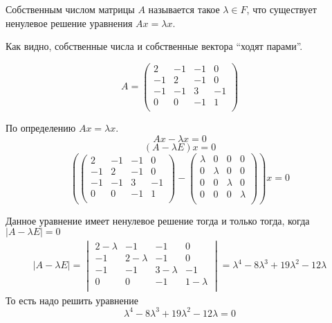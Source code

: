 \begin{definition}
Собственным числом матрицы $A$ называется такое $\lambda \in F$, что существует ненулевое решение уравнения $Ax = \lambda x$.
\end{definition}

Как видно, собственные числа и собственные вектора ``ходят парами''.

\begin{example}

$$
A = \left({
  \begin{array}{rrrrrr}
  2  & -1 & -1 & 0  \\
  -1 & 2  & -1 & 0  \\
  -1 & -1 & 3  & -1 \\
  0  & 0  & -1 & 1  \\
  \end{array}
  }\right)
$$

По определению $Ax = \lambda x$. 
$$Ax - \lambda x = 0$$
$$(A - \lambda E) x = 0$$
$$
(\left({
  \begin{array}{rrrrrr}
  2  & -1 & -1 & 0  \\
  -1 & 2  & -1 & 0  \\
  -1 & -1 & 3  & -1 \\
  0  & 0  & -1 & 1  \\
  \end{array}
  }\right) -  \left({
  \begin{array}{rrrrrr}
  \lambda  & 0 & 0 & 0  \\
  0 & \lambda  & 0 & 0  \\
  0 & 0 & \lambda  & 0 \\
  0  & 0  & 0 & \lambda  \\
  \end{array}
  }\right)) x = 0
$$

Данное уравнение имеет ненулевое решение тогда и только тогда, когда $|A - \lambda E| = 0$
\begin{align*}
|A - \lambda E| =
  \begin{vmatrix}
  2 - \lambda & -1 & -1 & 0  \\
  -1 & 2 - \lambda & -1 & 0  \\
  -1 & -1 & 3 - \lambda & -1 \\
  0  & 0  & -1 & 1 - \lambda \\
  \end{vmatrix} = \lambda^4-8\lambda^3+19\lambda^2-12\lambda
\end{align*}
То есть надо решить уравнение 
$$
\lambda^4-8\lambda^3+19\lambda^2-12\lambda = 0
$$


\end{example}
